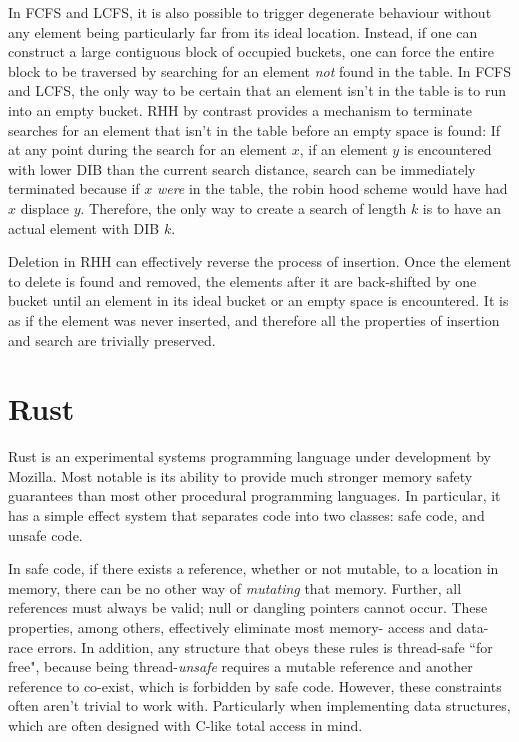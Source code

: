 \documentclass{cccg13}
\begin{document}
In FCFS and LCFS, it is also possible to trigger degenerate behaviour without
any element being particularly far from its ideal location. Instead, if one
can construct a large contiguous block of occupied buckets, one can force the
entire block to be traversed by searching for an element \emph{not} found in
the table. In FCFS and LCFS, the only way to be certain that an element isn't
in the table is to run into an empty bucket. RHH by contrast provides a
mechanism to terminate searches for an element that isn't in the table before
an empty space is found: If at any point during the search for an element $x$,
if an element $y$ is encountered with lower DIB than the current search
distance, search can be immediately terminated because if $x$ \emph{were} in
the table, the robin hood scheme would have had $x$ displace $y$. Therefore,
the only way to create a search of length $k$ is to have an actual element
with DIB $k$.

Deletion in RHH can effectively reverse the process of insertion. Once the
element to delete is found and removed, the elements after it are back-shifted
by one bucket until an element in its ideal bucket or an empty space is
encountered. It is as if the element was never inserted, and therefore all the
properties of insertion and search are trivially preserved.





\section{Rust}

Rust is an experimental systems programming language under development by
Mozilla. Most notable is its ability to provide much stronger memory safety
guarantees than most other procedural programming languages. In particular, it
has a simple effect system that separates code into two classes: safe code,
and unsafe code.

In safe code, if there exists a reference, whether or not mutable, to a
location in memory, there can be no other way of \emph{mutating} that memory.
Further, all references must always be valid; null or dangling pointers cannot
occur. These properties, among others, effectively eliminate most memory-
access and data-race errors. In addition, any structure that obeys these rules
is thread-safe ``for free", because being thread-\emph{unsafe} requires a
mutable reference and another reference to co-exist, which is forbidden by
safe code. However, these constraints often aren't trivial to work with.
Particularly when implementing data structures, which are often designed with
C-like total access in mind.
\end{document}
